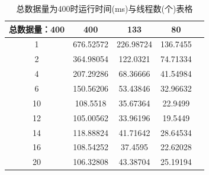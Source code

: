 \documentclass[UTF8]{ctexart}
\begin{document}
\begin{table}[H]
    \centering
    \begin{tabular}{|c|c|c|c|c|}
        \hline
        总数据量：400& 	400& 	133& 	80\\
        \hline
        1&	676.52572&	226.98724&	136.7455\\
        \hline
        2&	364.98054&	122.0321&	74.71334\\
        \hline
        4&	207.29286&	68.36666&	41.54984\\
        \hline
        6&	150.56206&	53.43846&	32.96632\\
        \hline
        10&	108.5518&	35.67364&	22.9499\\
        \hline
        12&	105.00562&	33.96196&	19.5449\\
        \hline
        14&	118.88824&	41.71642&	28.64534\\
        \hline
        16&	108.54252&	37.4595&	22.62028\\
        \hline
        20&	106.32808&	43.38704&	25.19194\\
        \hline
    \end{tabular}
    \caption{总数据量为400时运行时间(ms)与线程数(个)表格}
\end{table}
\clearpage
\end{document}

